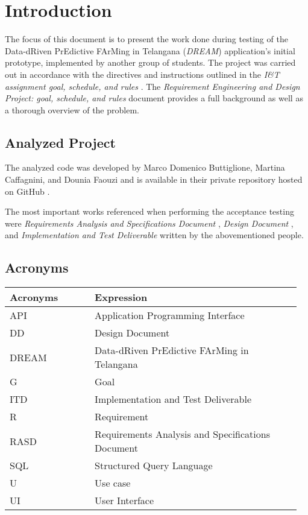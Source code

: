 \chapter{Introduction}

The focus of this document is to present the work done during testing of the Data-dRiven PrEdictive FArMing in Telangana (\textit{DREAM}) application's initial prototype, implemented by another group of students. The project was carried out in accordance with the directives and instructions outlined in the \textit{I\&T assignment goal, schedule, and rules} \cite{reference_doc2}. The \textit{Requirement Engineering and Design Project: goal, schedule, and rules} document \cite{reference_doc} provides a full background as well as a thorough overview of the problem.

\section{Analyzed Project}

The analyzed code was developed by Marco Domenico Buttiglione, Martina Caffagnini, and Dounia Faouzi and is available in their private repository hosted on GitHub \cite{dream}.

The most important works referenced when performing the acceptance testing were \textit{Requirements Analysis and Specifications Document} \cite{rasd}, \textit{Design Document} \cite{dd_doc}, and \textit{Implementation and Test Deliverable} \cite{itd_doc} written by the abovementioned people.

\section{Acronyms}

\begin{center}
	\begin{longtable}{@{}p{0.28\linewidth} p{0.68\linewidth}@{}}
		\toprule
		\textbf{Acronyms}   & \textbf{Expression}\\
		\endfirsthead
		\midrule
		API                 & Application Programming Interface\\
		DD                  & Design Document\\
		DREAM               & Data-dRiven PrEdictive FArMing in Telangana\\
		G					& Goal\\
		ITD					& Implementation and Test Deliverable\\
		R					& Requirement\\
		RASD                & Requirements Analysis and Specifications Document\\
		SQL                 & Structured Query Language\\
		U					& Use case\\
		UI                  & User Interface\\
		\bottomrule
	\end{longtable}
\end{center}

